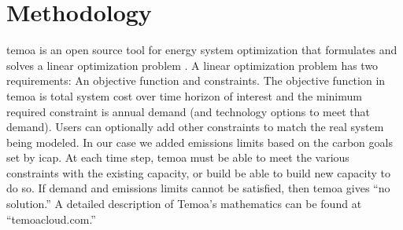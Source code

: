 \section{Methodology}
\gls{temoa} is an open source tool for energy system optimization that
formulates and solves a linear optimization problem
\cite{decarolis_tools_2020}. A linear optimization
problem has two requirements: An objective function and constraints. The
objective function in \gls{temoa} is total system cost over time horizon
of interest and the minimum required constraint is annual demand (and
technology options to meet that demand). Users can optionally add other
constraints to match the real system being modeled. In our case we added
emissions limits based on the carbon goals set by \gls{icap}. At each time step,
\gls{temoa} must be able to meet the various constraints with the existing
capacity, or build be able to build new capacity to do so. If demand and
emissions limits cannot be satisfied, then \gls{temoa} gives ``no solution.''
A detailed description of \gls{Temoa}'s mathematics can be found at ``temoacloud.com.''
